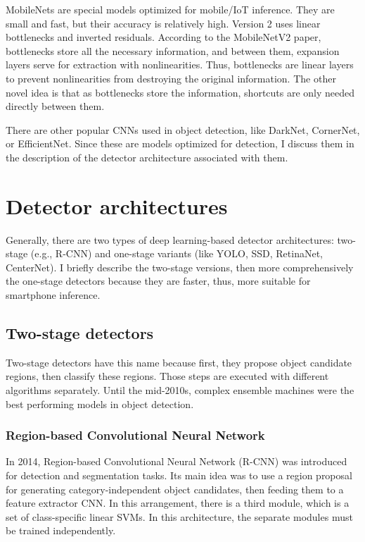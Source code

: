 MobileNets are special models optimized for mobile/IoT inference. They are small and fast, but their accuracy is relatively high. Version 2 uses linear bottlenecks and inverted residuals. According to the MobileNetV2 paper\cite{MobileNetV2}, bottlenecks store all the necessary information, and between them, expansion layers serve for extraction with nonlinearities. Thus, bottlenecks are linear layers to prevent nonlinearities from destroying the original information. The other novel idea is that as bottlenecks store the information, shortcuts are only needed directly between them.

There are other popular CNNs used in object detection, like DarkNet, CornerNet, or EfficientNet. Since these are models optimized for detection, I discuss them in the description of the detector architecture associated with them.

\section{Detector architectures}

Generally, there are two types of deep learning-based detector architectures: two-stage (e.g., R-CNN) and one-stage variants (like YOLO, SSD, RetinaNet, CenterNet). I briefly describe the two-stage versions, then more comprehensively the one-stage detectors because they are faster, thus, more suitable for smartphone inference.

\subsection{Two-stage detectors}

Two-stage detectors have this name because first, they propose object candidate regions, then classify these regions. Those steps are executed with different algorithms separately. Until the mid-2010s, complex ensemble machines were the best performing models in object detection.

\subsubsection{Region-based Convolutional Neural Network}

In 2014, Region-based Convolutional Neural Network\cite{R-CNN} (R-CNN) was introduced for detection and segmentation tasks. Its main idea was to use a region proposal for generating category-independent object candidates, then feeding them to a feature extractor CNN. In this arrangement, there is a third module, which is a set of class-specific linear SVMs. In this architecture, the separate modules must be trained independently.

